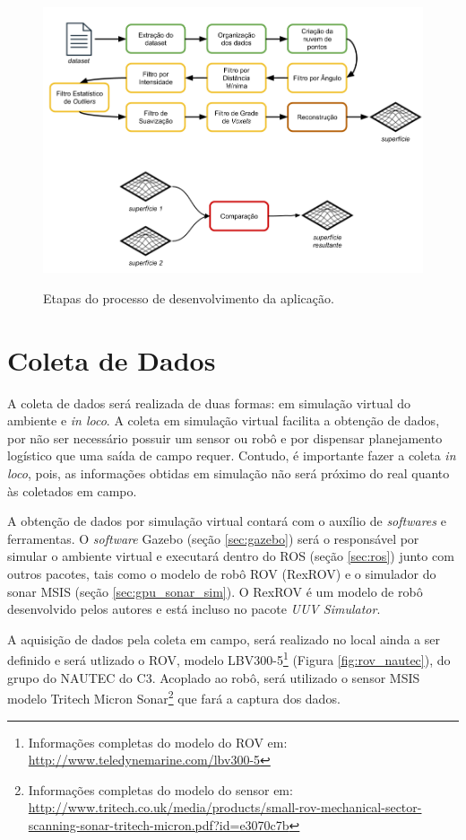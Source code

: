 \begin{figure}[H]
    \centering
    \caption{Etapas do processo de desenvolvimento da aplicação.}
    \includegraphics[scale=0.4]{dados/figuras/etapas.png}
    \label{fig:etapas}
\end{figure}

\section{Coleta de Dados}
\label{sec:coleta_dados}

A coleta de dados será realizada de duas formas: em simulação virtual do ambiente e \textit{in loco}. A coleta em simulação virtual facilita a obtenção de dados, por não ser necessário possuir um sensor ou robô e por dispensar planejamento logístico que uma saída de campo requer. Contudo, é importante fazer a coleta \textit{in loco}, pois, as informações obtidas em simulação não será próximo do real quanto às coletados em campo.

A obtenção de dados por simulação virtual contará com o auxílio de \textit{softwares} e ferramentas. O \textit{software} Gazebo  (seção \ref{sec:gazebo}) será o responsável por simular o ambiente virtual e executará dentro do ROS (seção \ref{sec:ros}) junto com outros pacotes, tais como o modelo de robô ROV (RexROV) e o simulador do sonar MSIS (seção \ref{sec:gpu_sonar_sim}). O RexROV é um modelo de robô desenvolvido pelos autores \cite{manhaes2016uuv} e está incluso no pacote \textit{UUV Simulator}.

A aquisição de dados pela coleta em campo, será realizado no local ainda a ser definido e será utlizado o ROV, modelo LBV300-5\footnote{Informações completas do modelo do ROV em: \url{http://www.teledynemarine.com/lbv300-5}} (Figura \ref{fig:rov_nautec}), do grupo do NAUTEC do C3. Acoplado ao robô, será utilizado o sensor MSIS modelo Tritech Micron Sonar\footnote{Informações completas do modelo do sensor em: \url{http://www.tritech.co.uk/media/products/small-rov-mechanical-sector-scanning-sonar-tritech-micron.pdf?id=e3070c7b}} que fará a captura dos dados.

